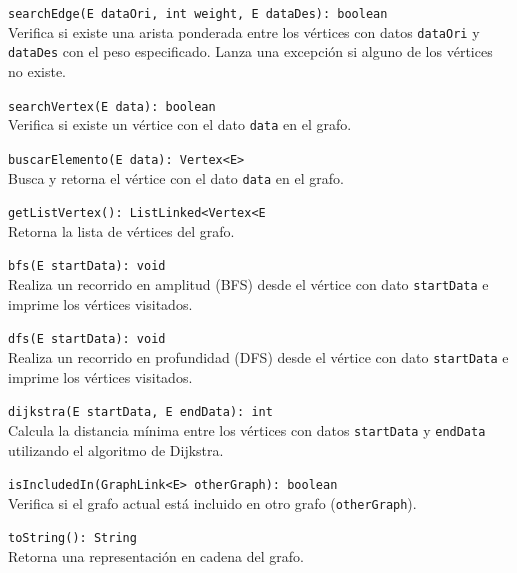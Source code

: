 \documentclass{article}
\begin{document}
\begin{itemize}
                    \item \texttt{searchEdge(E dataOri, int weight, E dataDes): boolean}\\
                    Verifica si existe una arista ponderada entre los vértices con datos \texttt{dataOri} y \texttt{dataDes} con el peso especificado. Lanza una excepción si alguno de los vértices no existe.
                    
                    \item \texttt{searchVertex(E data): boolean}\\
                    Verifica si existe un vértice con el dato \texttt{data} en el grafo.
                    
                    {\item \texttt{buscarElemento(E data): Vertex<E>}\\
                    Busca y retorna el vértice con el dato \texttt{data} en el grafo.}
                    
                    {\item \texttt{getListVertex(): ListLinked<Vertex<E\>\>}\\
                    Retorna la lista de vértices del grafo.}
                    
                    \item \texttt{bfs(E startData): void}\\
                    Realiza un recorrido en amplitud (BFS) desde el vértice con dato \texttt{startData} e imprime los vértices visitados.
                    
                    \item \texttt{dfs(E startData): void}\\
                    Realiza un recorrido en profundidad (DFS) desde el vértice con dato \texttt{startData} e imprime los vértices visitados.
                    
                    \item \texttt{dijkstra(E startData, E endData): int}\\
                    Calcula la distancia mínima entre los vértices con datos \texttt{startData} y \texttt{endData} utilizando el algoritmo de Dijkstra.
                    
                    \item \texttt{isIncludedIn(GraphLink<E> otherGraph): boolean}\\
                    Verifica si el grafo actual está incluido en otro grafo (\texttt{otherGraph}).
                    
                    \item \texttt{toString(): String}\\
                    Retorna una representación en cadena del grafo.
                \end{itemize}
\end{document}
